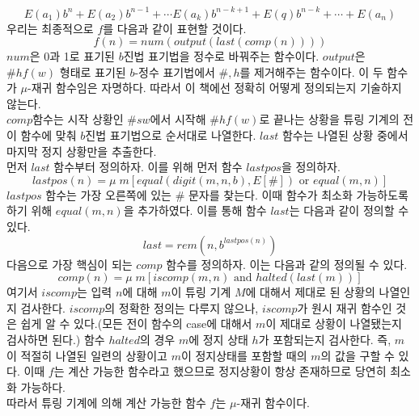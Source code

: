 \documentclass[b5paper]{book}
\theoremstyle{definition}
\newenvironment{pf*}{\pushQED{\qed}\pf}{\popQED\endpf}
\begin{document}
\begin{pf*}
    $$E(a_1)b^n + E(a_2)b^{n-1} + \cdots E(a_k)b^{n-k+1} + E(q)b^{n-k} + \cdots + E(a_n)$$
    우리는 최종적으로 $f$를 다음과 같이 표현할 것이다.
    $$f(n) = num(output(last(comp(n))))$$
    $num$은 0과 1로 표기된 $b$진법 표기법을 정수로 바꿔주는 함수이다. 
    $output$은 $\# h f(w)$ 형태로 표기된 $b$-정수 표기법에서 $\#, h$를 제거해주는 함수이다.
    이 두 함수가 $\mu$-재귀 함수임은 자명하다. 따라서 이 책에선 정확히 어떻게 정의되는지 기술하지 않는다.\\ 
    $comp$함수는 시작 상황인 $\# s w$에서 시작해 $\# h f(w)$로 끝나는 상황을 튜링 기계의 
    전이 함수에 맞춰 $b$진법 표기법으로 순서대로 나열한다. $last$ 함수는 나열된 상황 중에서 마지막 정지 상황만을
    추출한다. \\ 
    먼저 $last$ 함수부터 정의하자. 이를 위해 먼저 함수 $lastpos$을 정의하자. 
    $$lastpos(n)= \mu \; m [equal(digit(m,n,b),E[\#]) \text{ or } equal(m,n)]$$
    $lastpos$ 함수는 가장 오른쪽에 있는 $\#$ 문자를 찾는다. 이때 함수가 최소화 가능하도록 하기 위해
    $equal(m,n)$을 추가하였다. 이를 통해 함수 $last$는 다음과 같이 정의할 수 있다.
    $$last = rem(n,b^{lastpos(n)})$$ 
    다음으로 가장 핵심이 되는 $comp$ 함수를 정의하자. 이는 다음과 같의 정의될 수 있다.
    $$comp(n) = \mu \; m [iscomp(m,n) \text{ and } halted(last(m))]$$
    여기서 $iscomp$는 입력 $n$에 대해 $m$이 튜링 기계 $M$에 대해서 제대로 된 상황의 나열인지 검사한다. 
    $iscomp$의 정확한 정의는 다루지 않으나, $iscomp$가 원시 재귀 함수인 것은 쉽게 알 수 있다.(모든 전이 함수의
    case에 대해서 $m$이 제대로 상황이 나열됐는지 검사하면 된다.) 함수 $halted$의 경우 $m$에 
    정지 상태 $h$가 포함되는지 검사한다. 즉, $m$이 적절히 나열된 일련의 상황이고 $m$이 정지상태를 포함할 때의 
    $m$의 값을 구할 수 있다. 이때 $f$는 계산 가능한 함수라고 했으므로 정지상황이 항상 존재하므로 당연히 최소화 가능하다. \\ 
    따라서 튜링 기계에 의해 계산 가능한 함수 $f$는 $\mu$-재귀 함수이다. 
\end{pf*}
\end{document}
